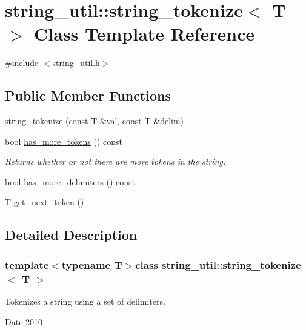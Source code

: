 \hypertarget{classstring__util_1_1string__tokenize}{\section{string\-\_\-util\-:\-:string\-\_\-tokenize$<$ T $>$ Class Template Reference}
\label{classstring__util_1_1string__tokenize}
}


{\ttfamily \#include $<$string\-\_\-util.\-h$>$}

\subsection*{Public Member Functions}
\begin{DoxyCompactItemize}
\item 
\hyperlink{classstring__util_1_1string__tokenize_a9fa8071705dcc90643f09e06a9477c84}{string\-\_\-tokenize} (const T \&val, const T \&delim)
\item 
\hypertarget{classstring__util_1_1string__tokenize_aa5a47b04db8cb0a89a1abee60433a749}{bool \hyperlink{classstring__util_1_1string__tokenize_aa5a47b04db8cb0a89a1abee60433a749}{has\-\_\-more\-\_\-tokens} () const }\label{classstring__util_1_1string__tokenize_aa5a47b04db8cb0a89a1abee60433a749}

\begin{DoxyCompactList}\small\item\em Returns whether or not there are more tokens in the string. \end{DoxyCompactList}\item 
bool \hyperlink{classstring__util_1_1string__tokenize_a1406728dca7da668c3173b04dcd76aa1}{has\-\_\-more\-\_\-delimiters} () const 
\item 
T \hyperlink{classstring__util_1_1string__tokenize_a1a8c9f87285c8e4f14419af752d84f37}{get\-\_\-next\-\_\-token} ()
\end{DoxyCompactItemize}


\subsection{Detailed Description}
\subsubsection*{template$<$typename T$>$class string\-\_\-util\-::string\-\_\-tokenize$<$ T $>$}

Tokenizes a string using a set of delimiters. \begin{DoxyDate}{Date}
2010 
\end{DoxyDate}


